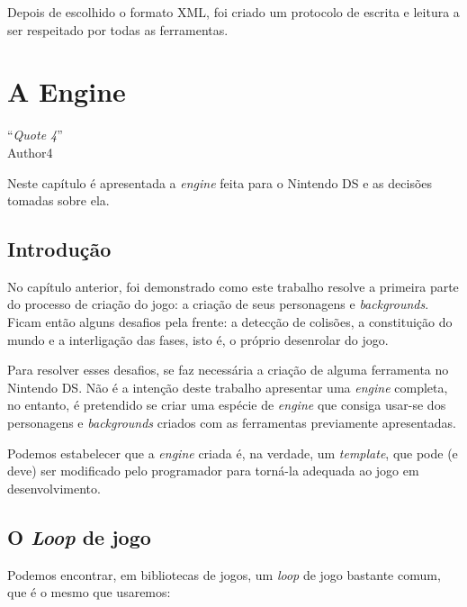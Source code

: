 \documentclass[brazil]{abnt}
\begin{document}
Depois de escolhido o formato XML, foi criado um protocolo de escrita e leitura a ser respeitado por todas as ferramentas.



\chapter{A Engine}

\vfill{}
\begin{flushright}{}
``\emph{Quote 4}''\\
{\small Author4}\end{flushright}{\small \par}
\vfill{}

Neste capítulo é apresentada a \textit{engine} feita para o Nintendo DS e as decisões tomadas sobre ela.
\newpage

\section{Introdução}

No capítulo anterior, foi demonstrado como este trabalho resolve a primeira parte do processo de criação do jogo: a criação de seus personagens e \textit{backgrounds}. Ficam então alguns desafios pela frente: a detecção de colisões, a constituição do mundo e a interligação das fases, isto é, o próprio desenrolar do jogo.

Para resolver esses desafios, se faz necessária a criação de alguma ferramenta no Nintendo DS. Não é a intenção deste trabalho apresentar uma \textit{engine} completa, no entanto, é pretendido se criar uma espécie de \textit{engine} que consiga usar-se dos personagens e \textit{backgrounds} criados com as ferramentas previamente apresentadas.

Podemos estabelecer que a \textit{engine} criada é, na verdade, um \textit{template}, que pode (e deve) ser modificado pelo programador para torná-la adequada ao jogo em desenvolvimento.

\section{O \textit{Loop} de jogo}

Podemos encontrar, em bibliotecas de jogos, um \textit{loop} de jogo bastante comum, que é o mesmo que usaremos:
\end{document}
